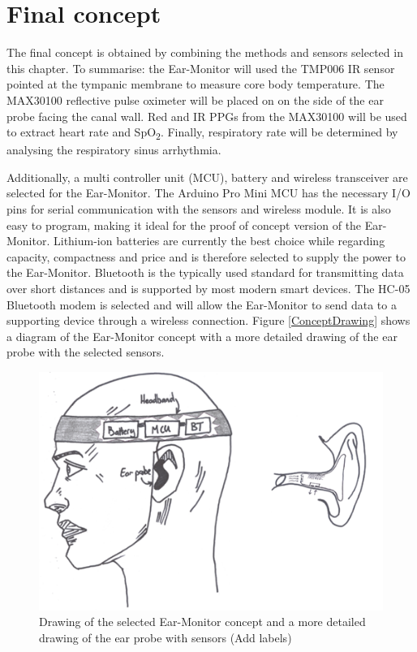 \section{Final concept}
The final concept is obtained by combining the methods and sensors selected in this chapter. To summarise: the Ear-Monitor will used the TMP006 IR sensor pointed at the tympanic membrane to measure core body temperature. The MAX30100 reflective pulse oximeter will be placed on on the side of the ear probe facing the canal wall. Red and IR PPGs from the MAX30100 will be used to extract heart rate and SpO\textsubscript{2}. Finally, respiratory rate will be determined by analysing the respiratory sinus arrhythmia.

\medskip

Additionally, a multi controller unit (MCU), battery and wireless transceiver are selected for the Ear-Monitor. The Arduino Pro Mini MCU has the necessary I/O pins for serial communication with the sensors and wireless module. It is also easy to program, making it ideal for the proof of concept version of the Ear-Monitor. Lithium-ion batteries are currently the best choice while regarding capacity, compactness and price and is therefore selected to supply the power to the Ear-Monitor. Bluetooth is the typically used standard for transmitting data over short distances and is supported by most modern smart devices. The HC-05 Bluetooth modem is selected and will allow the Ear-Monitor to send data to a supporting device through a wireless connection. Figure \ref{ConceptDrawing} shows a diagram of the Ear-Monitor concept with a more detailed drawing of the ear probe with the selected sensors.

\begin{figure}[H]
   \centering
   \includegraphics[scale=1]{figs/ConceptDrawing.png}
   \caption{Drawing of the selected Ear-Monitor concept and a more detailed drawing of the ear probe with sensors (Add labels)}
   \label{fig:ConceptDrawing}
\end{figure}
